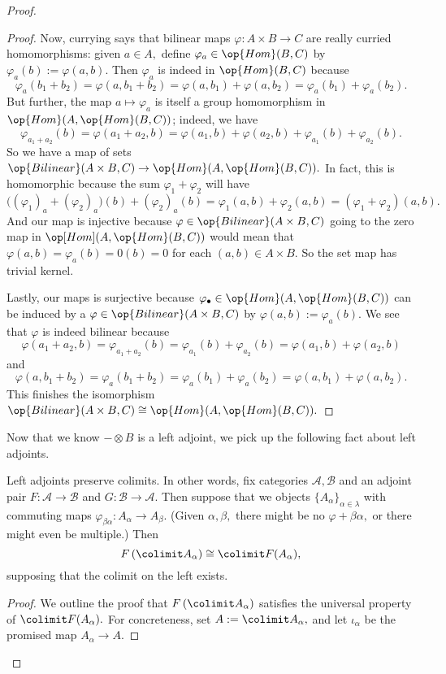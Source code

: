 \documentclass[../notes.tex]{subfiles}
\begin{document}
\begin{proof}
\begin{proof}
		Now, currying says that bilinear maps $\varphi:A\times B\to C$ are really curried homomorphisms: given $a\in A,$ define $\varphi_a\in\op{Hom}(B,C)$ by $\varphi_a(b):=\varphi(a,b).$ Then $\varphi_a$ is indeed in $\op{Hom}(B,C)$ because
		\[\varphi_a(b_1+b_2)=\varphi(a,b_1+b_2)=\varphi(a,b_1)+\varphi(a,b_2)=\varphi_a(b_1)+\varphi_a(b_2).\]
		But further, the map $a\mapsto\varphi_a$ is itself a group homomorphism in $\op{Hom}(A,\op{Hom}(B,C))$; indeed, we have
		\[\varphi_{a_1+a_2}(b)=\varphi(a_1+a_2,b)=\varphi(a_1,b)+\varphi(a_2,b)+\varphi_{a_1}(b)+\varphi_{a_2}(b).\]
		So we have a map of sets $\op{Bilinear}(A\times B,C)\to\op{Hom}(A,\op{Hom}(B,C)).$ In fact, this is homomorphic because the sum $\varphi_1+\varphi_2$ will have
		\[\big((\varphi_1)_a+(\varphi_2)_a\big)(b)+(\varphi_2)_a(b)=\varphi_1(a,b)+\varphi_2(a,b)=(\varphi_1+\varphi_2)(a,b).\]
		And our map is injective because $\varphi\in\op{Bilinear}(A\times B,C)$ going to the zero map in $\op[Hom](A,\op{Hom}(B,C))$ would mean that $\varphi(a,b)=\varphi_a(b)=0(b)=0$ for each $(a,b)\in A\times B.$ So the set map has trivial kernel.

		Lastly, our maps is surjective because $\varphi_\bullet\in\op{Hom}(A,\op{Hom}(B,C))$ can be induced by a $\varphi\in\op{Bilinear}(A\times B,C)$ by $\varphi(a,b):=\varphi_a(b).$ We see that $\varphi$ is indeed bilinear because
		\[\varphi(a_1+a_2,b)=\varphi_{a_1+a_2}(b)=\varphi_{a_1}(b)+\varphi_{a_2}(b)=\varphi(a_1,b)+\varphi(a_2,b)\]
		and
		\[\varphi(a,b_1+b_2)=\varphi_a(b_1+b_2)=\varphi_a(b_1)+\varphi_a(b_2)=\varphi(a,b_1)+\varphi(a,b_2).\]
		This finishes the isomorphism $\op{Bilinear}(A\times B,C)\cong\op{Hom}(A,\op{Hom}(B,C)).$
	\end{proof}
	Now that we know $-\otimes B$ is a left adjoint, we pick up the following fact about left adjoints.
	\begin{lemma} \label{lem:leftcolimit}
		Left adjoints preserve colimits. In other words, fix categories $\mathcal A,\mathcal B$ and an adjoint pair $F:\mathcal A\to\mathcal B$ and $G:\mathcal B\to\mathcal A.$ Then suppose that we objects $\{A_\alpha\}_{\alpha\in\lambda}$ with commuting maps $\varphi_{\beta\alpha}:A_\alpha\to A_\beta.$ (Given $\alpha,\beta,$ there might be no $\varphi+{\beta\alpha},$ or there might even be multiple.) Then
		\[F\left(\colimit A_\alpha\right)\cong\colimit F(A_\alpha),\]
		supposing that the colimit on the left exists.
	\end{lemma}
	\begin{proof}
		We outline the proof that $F\left(\colimit A_\alpha\right)$ satisfies the universal property of $\colimit F(A_\alpha).$ For concreteness, set $A:=\colimit A_\alpha,$ and let $\iota_\alpha$ be the promised map $A_\alpha\to A.$
		

\end{proof}
\end{proof}
\end{document}
